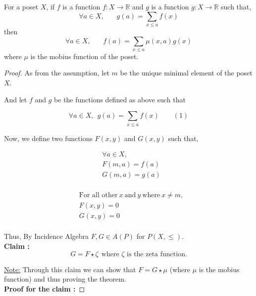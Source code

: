 \begin{theorem}

For a poset $X$, if $f$ is a function $f: X \rightarrow \mathbb{R}$ and $g$ is a function $g: X \rightarrow \mathbb{R}$ such that,
$$\forall a \in X, ~~~~~~~~g(a) = \sum_{x \le a} f(x)$$ 
then
$$\boxed{\forall a \in X, ~~~~~~~~f(a) = \sum_{x \le a} \mu(x,a) g(x)}$$
where $\mu$ is the mobius function of the poset.
\end{theorem}

\begin{proof}

As from the assumption, let $m$ be the unique minimal element of the poset $X$.

\noindent And let $f$ and $g$ be the functions defined as above such that 

$$\forall a \in X, ~~g(a) = \sum\limits_{x \le a} f(x)  ~~~~~~~~~(1)$$

\noindent Now, we define two functions $F(x,y)$ and $G(x,y)$ such that,

\begin{minipage}{0.48\linewidth}
\begin{align*}
   & \forall a \in X ,\\
   & F(m,a) = f(a)\\
   & G(m,a) = g(a)\\
\end{align*}
\end{minipage}
\begin{minipage}{0.48\linewidth}
\begin{align*}
   & \textrm{For all other}~ x ~\textrm{and} ~ y ~ \textrm{where} ~ x \ne m,\\
   & F(x,y) = 0\\
   & G(x,y) = 0\\
\end{align*}
\end{minipage}

\noindent Thus, By Incidence Algebra $F,G \in A(P)$ for $P(X,\le)$.\\

\noindent \textbf{Claim :}
$$\boxed{G = F \star \zeta ~~\textrm{where $\zeta$ is the zeta function.}}$$

\noindent \underline{Note:} Through this claim we can show that $F = G \star \mu$ (where $\mu$ is the mobius function) and thus proving the theorem.\\


\noindent \textbf{Proof for the claim :}


\end{proof}

